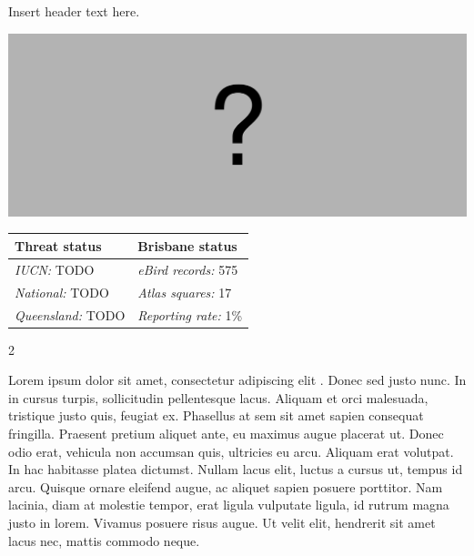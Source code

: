 \documentclass[12pt,openany,oneside]{book}
\let\origfigure\figure
\let\endorigfigure\endfigure
\renewenvironment{figure}[1][2] {
  \expandafter\origfigure\expandafter[H]
} {
  \endorigfigure
}
\let\Begin\begin
\let\End\end
\theoremstyle{definition}
\theoremstyle{definition}
\theoremstyle{definition}
\theoremstyle{remark}
\begin{document}

Insert header text here.

\begin{figure}
\centering
\includegraphics[width=\textwidth,keepaspectratio=true]{assets/misc/missing-profile.png}
\caption{Insert caption here.}
\end{figure}

\begin{tabu} to 
\toprule
Threat status & Brisbane status\\
\midrule
\textit{IUCN:} TODO & \textit{eBird records:} 575\\
\textit{National:} TODO & \textit{Atlas squares:} 17\\
\textit{Queensland:} TODO & \textit{Reporting rate:} 1\%\\
\bottomrule
\end{tabu} 
\vspace{0.15cm}

\Begin{multicols}{2}

Lorem ipsum dolor sit amet, consectetur adipiscing elit
\citep{rexample1, rexample2, rexample3}. Donec sed justo nunc. In in
cursus turpis, sollicitudin pellentesque lacus. Aliquam et orci
malesuada, tristique justo quis, feugiat ex. Phasellus at sem sit amet
sapien consequat fringilla. Praesent pretium aliquet ante, eu maximus
augue placerat ut. Donec odio erat, vehicula non accumsan quis,
ultricies eu arcu. Aliquam erat volutpat. In hac habitasse platea
dictumst. Nullam lacus elit, luctus a cursus ut, tempus id arcu. Quisque
ornare eleifend augue, ac aliquet sapien posuere porttitor. Nam lacinia,
diam at molestie tempor, erat ligula vulputate ligula, id rutrum magna
justo in lorem. Vivamus posuere risus augue. Ut velit elit, hendrerit
sit amet lacus nec, mattis commodo neque.

\End{multicols}

\clearpage
\end{document}
